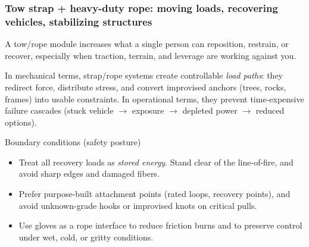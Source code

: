 \begin{frame}[t]
  \frametitle{Tow strap + heavy-duty rope: moving loads, recovering vehicles, stabilizing structures}
  \justifying
  A tow/rope module increases what a single person can reposition, restrain, or recover, especially when traction, terrain, and leverage are working against you.

  \vspace{0.5em}
  In mechanical terms, strap/rope systems create controllable \emph{load paths}: they redirect force, distribute stress, and convert improvised anchors (trees, rocks, frames) into usable constraints. In operational terms, they prevent time-expensive failure cascades (stuck vehicle \(\rightarrow\) exposure \(\rightarrow\) depleted power \(\rightarrow\) reduced options).

  \vspace{0.8em}
  \begin{block}{Boundary conditions (safety posture)}
    \begin{itemize}
      \item Treat all recovery loads as \emph{stored energy}. Stand clear of the line-of-fire, and avoid sharp edges and damaged fibers.
      \item Prefer purpose-built attachment points (rated loops, recovery points), and avoid unknown-grade hooks or improvised knots on critical pulls.
      \item Use gloves as a rope interface to reduce friction burns and to preserve control under wet, cold, or gritty conditions.
    \end{itemize}
  \end{block}
\end{frame}

